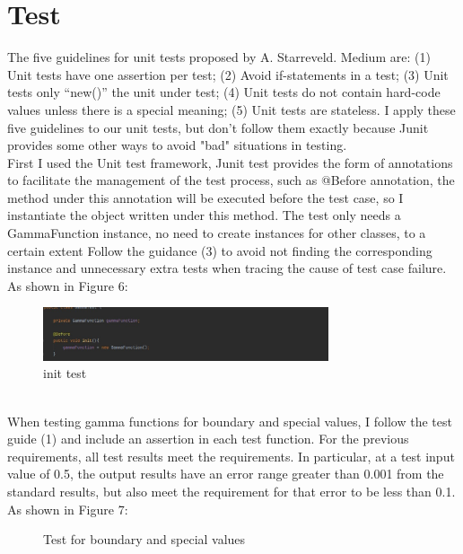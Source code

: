 \documentclass{report}
\begin{document}
\newpage
\section{Test}
The five guidelines for unit tests proposed by A. Starreveld. Medium\cite{medium.com} are: (1) Unit tests have one assertion per test; (2) Avoid if-statements in a test; (3) Unit tests only “new()” the unit under test; (4) Unit tests do not contain hard-code values unless there is a special meaning; (5) Unit tests are stateless. I apply these five guidelines to our unit tests, but don't follow them exactly because Junit provides some other ways to avoid "bad" situations in testing. 
\\First I used the Unit test framework, Junit test provides the form of annotations to facilitate the management of the test process, such as @Before annotation, the method under this annotation will be executed before the test case, so I instantiate the object written under this method.  The test only needs a GammaFunction instance, no need to create instances for other classes, to a certain extent Follow the guidance (3) to avoid not finding the corresponding instance and unnecessary extra tests when tracing the cause of test case failure. As shown in Figure 6:
\begin{figure}[htbp]
\centering
\includegraphics[width=0.75\textwidth]{test_1}
\caption{init test}
\end{figure}
\\When testing gamma functions for boundary and special values, I follow the test guide (1) and include an assertion in each test function. For the previous requirements, all test results meet the requirements. In particular, at a test input value of 0.5, the output results have an error range greater than 0.001 from the standard results, but also meet the requirement for that error to be less than 0.1. As shown in Figure 7:
\begin{figure}[H]
    \centering
    \caption{Test for boundary and special values}
\end{figure}
\end{document}
